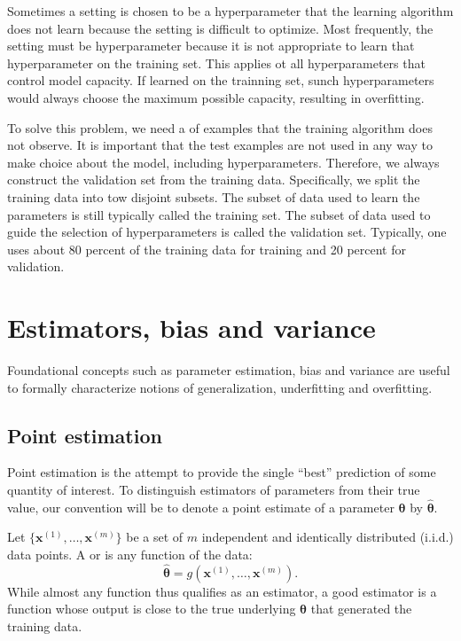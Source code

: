 Sometimes a setting is chosen to be a hyperparameter that the learning algorithm does not learn because the setting is difficult to optimize.
Most frequently, the setting must be hyperparameter because it is not appropriate to learn that hyperparameter on the training set.
This applies ot all hyperparameters that control model capacity.
If learned on the trainning set, sunch hyperparameters would always choose the maximum possible capacity, resulting in overfitting.


To solve this problem, we need a  of examples that the training algorithm does not observe.
It is important that the test examples are not used in any way to make choice about the model, including hyperparameters.
Therefore, we always construct the validation set from the training data.
Specifically, we split the training data into tow disjoint subsets.
The subset of data used to learn the parameters is still typically called the training set.
The subset of data used to guide the selection of hyperparameters is called the validation set.
Typically, one uses about 80 percent of the training data for training and 20 percent for validation.

\section{Estimators, bias and variance}

Foundational concepts such as parameter estimation, bias and variance are useful to formally characterize notions of generalization, underfitting and overfitting.

\subsection{Point estimation}
Point estimation is the attempt to provide the single ``best'' prediction of some quantity of interest.
To distinguish estimators of parameters from their true value, our convention will be to denote a point estimate of a parameter $\bm{\theta}$ by $\hat{\bm{\theta}}$.

Let $\{\bm{x}^{(1)},\dots,\bm{x}^{(m)}\}$ be a set of $m$ independent and identically distributed (i.i.d.) data points.
A  or  is any function of the data:
\begin{equation}
  \hat{\bm{\theta}} = g(\bm{x}^{(1)},\dots,\bm{x}^{(m)}).
\end{equation}
While almost any function thus qualifies as an estimator, a good estimator is a function whose output is close to the true underlying $\bm{\theta}$ that generated the training data.

